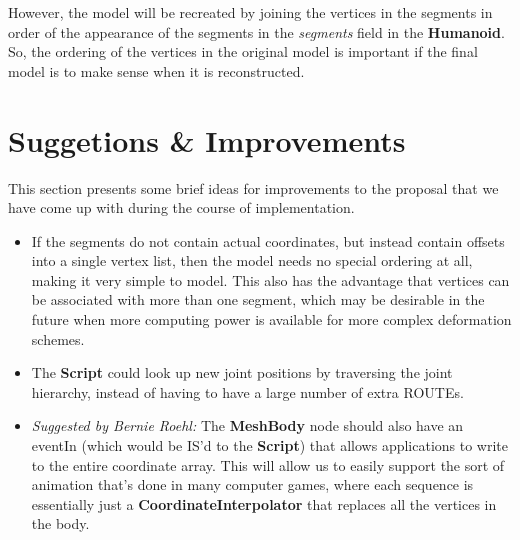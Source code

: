 \documentclass[12pt,oneside,a4paper,titlepage]{article}
\begin{document}
However, the model will be recreated by joining the vertices in the segments in order of the appearance of the segments in the {\it segments} field in the {\bf Humanoid}. So, the ordering of the vertices in the original model is important if the final model is to make sense when it is reconstructed.

\section{\label{sec:improvements}Suggetions \& Improvements}
This section presents some brief ideas for improvements to the proposal that we have come up with during the course of implementation.

\begin{itemize}
\item If the segments do not contain actual coordinates, but instead contain offsets into a single vertex list, then the model needs no special ordering at all, making it very simple to model. This also has the advantage that vertices can be associated with more than one segment, which may be desirable in the future when more computing power is available for more complex deformation schemes.
\item The {\bf Script} could look up new joint positions by traversing the joint hierarchy, instead of having to have a large number of extra ROUTEs.
\item {\it Suggested by Bernie Roehl:} The {\bf MeshBody} node should also have an eventIn (which would be IS'd to the {\bf Script}) that allows applications to write to the entire coordinate array.  This will allow us to easily support the sort of animation that's done in many computer games, where each sequence is essentially just a {\bf CoordinateInterpolator} that replaces all the vertices in the body.
\end{itemize}



\end{document}
